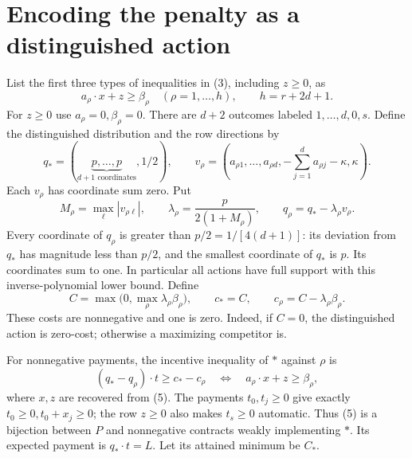 \documentclass[11pt]{article}
\begin{document}
\section{Encoding the penalty as a distinguished action}
List the first three types of inequalities in (3), including \(z\geq0\), as
\[
 a_\rho\cdot x+z\geq\beta_\rho
       \quad(\rho=1,\ldots,h),\qquad h=r+2d+1.       \tag{8}
\]
For \(z\geq0\) use \(a_\rho=0,\beta_\rho=0\). There are \(d+2\)
outcomes labeled \(1,\ldots,d,0,s\). Define the distinguished distribution
and the row directions by
\[
 q_*=(\underbrace{p,\ldots,p}_{d+1\text{ coordinates}},1/2),
 \qquad
 v_\rho=\left(a_{\rho1},\ldots,a_{\rho d},
             -\sum_{j=1}^d a_{\rho j}-\kappa,\kappa\right).
                                                               \tag{9}
\]
Each \(v_\rho\) has coordinate sum zero. Put
\[
 M_\rho=\max_\ell |v_{\rho\ell}|,\qquad
 \lambda_\rho=\frac{p}{2(1+M_\rho)},\qquad
 q_\rho=q_*-\lambda_\rho v_\rho.                   \tag{10}
\]
Every coordinate of \(q_\rho\) is greater than
\(p/2=1/[4(d+1)]\): its deviation from \(q_*\) has magnitude less
than \(p/2\), and the smallest coordinate of \(q_*\) is \(p\).
Its coordinates sum to one. In particular all actions have full support
with this inverse-polynomial lower bound. Define
\[
 C=\max\bigl(0,\max_\rho\lambda_\rho\beta_\rho\bigr),
 \qquad c_*=C,\qquad c_\rho=C-\lambda_\rho\beta_\rho.
                                                               \tag{11}
\]
These costs are nonnegative and one is zero. Indeed, if \(C=0\), the
distinguished action is zero-cost; otherwise a maximizing competitor is.

For nonnegative payments, the incentive inequality of \(*\) against
\(\rho\) is
\[
 (q_*-q_\rho)\cdot t\geq c_*-c_\rho
 \quad\Longleftrightarrow\quad
 a_\rho\cdot x+z\geq\beta_\rho,                    \tag{12}
\]
where \(x,z\) are recovered from (5). The payments \(t_0,t_j\geq0\)
give exactly \(t_0\geq0,t_0+x_j\geq0\); the row \(z\geq0\) also
makes \(t_s\geq0\) automatic. Thus (5) is a bijection between \(P\)
and nonnegative contracts weakly implementing \(*\). Its expected payment
is \(q_*\cdot t=L\). Let its attained minimum be \(C_*\).
\end{document}
